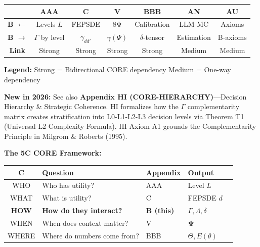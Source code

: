 \begin{tcolorbox}[colback=white, colframe=black, 
    title=\textbf{Cross-Reference Map}]

\begin{center}
\small
\begin{tabular}{@{}c|cccccc@{}}
\toprule
& \textbf{AAA} & \textbf{C} & \textbf{V} & \textbf{BBB} & \textbf{AN} & \textbf{AU} \\
\midrule
\textbf{B $\leftarrow$} & Levels $L$ & FEPSDE & 8Ψ & Calibration & LLM-MC & Axioms \\
\textbf{B $\rightarrow$} & $\Gamma$ by level & $\gamma_{dd'}$ & $\gamma(\Psi)$ & $\delta$-tensor & Estimation & B-axioms \\
\midrule
\textbf{Link} & \cellcolor{red!20}Strong & \cellcolor{red!20}Strong & \cellcolor{red!20}Strong & \cellcolor{red!20}Strong & \cellcolor{yellow!20}Medium & \cellcolor{yellow!20}Medium \\
\bottomrule
\end{tabular}
\end{center}

\textbf{Legend:}
\colorbox{red!20}{Strong} = Bidirectional CORE dependency \quad
\colorbox{yellow!20}{Medium} = One-way dependency

\textbf{New in 2026:} See also \textbf{Appendix HI (CORE-HIERARCHY)}---Decision Hierarchy \& Strategic Coherence. HI formalizes how the $\Gamma$ complementarity matrix creates stratification into L0-L1-L2-L3 decision levels via Theorem T1 (Universal L2 Complexity Formula). HI Axiom A1 grounds the Complementarity Principle in Milgrom \& Roberts (1995).

\textbf{The 5C CORE Framework:}
\begin{center}
\begin{tabular}{@{}cllll@{}}
\toprule
\textbf{C} & \textbf{Question} & \textbf{Appendix} & \textbf{Output} \\
\midrule
WHO & Who has utility? & AAA & Level $L$ \\
WHAT & What is utility? & C & FEPSDE $d$ \\
\textbf{HOW} & \textbf{How do they interact?} & \textbf{B (this)} & $\Gamma, \Lambda, \delta$ \\
WHEN & When does context matter? & V & $\boldsymbol{\Psi}$ \\
WHERE & Where do numbers come from? & BBB & $\Theta, E(\theta)$ \\
\bottomrule
\end{tabular}
\end{center}

\end{tcolorbox}

